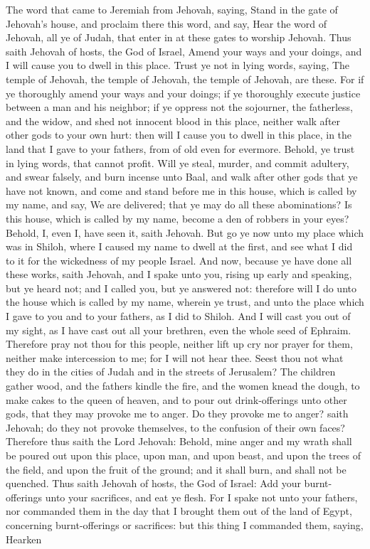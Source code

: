 The word that came to Jeremiah from Jehovah, saying, Stand in the gate of Jehovah’s house, and proclaim there this word, and say, Hear the word of Jehovah, all ye of Judah, that enter in at these gates to worship Jehovah. Thus saith Jehovah of hosts, the God of Israel, Amend your ways and your doings, and I will cause you to dwell in this place. Trust ye not in lying words, saying, The temple of Jehovah, the temple of Jehovah, the temple of Jehovah, are these. For if ye thoroughly amend your ways and your doings; if ye thoroughly execute justice between a man and his neighbor; if ye oppress not the sojourner, the fatherless, and the widow, and shed not innocent blood in this place, neither walk after other gods to your own hurt: then will I cause you to dwell in this place, in the land that I gave to your fathers, from of old even for evermore.  Behold, ye trust in lying words, that cannot profit. Will ye steal, murder, and commit adultery, and swear falsely, and burn incense unto Baal, and walk after other gods that ye have not known, and come and stand before me in this house, which is called by my name, and say, We are delivered; that ye may do all these abominations? Is this house, which is called by my name, become a den of robbers in your eyes? Behold, I, even I, have seen it, saith Jehovah.  But go ye now unto my place which was in Shiloh, where I caused my name to dwell at the first, and see what I did to it for the wickedness of my people Israel. And now, because ye have done all these works, saith Jehovah, and I spake unto you, rising up early and speaking, but ye heard not; and I called you, but ye answered not: therefore will I do unto the house which is called by my name, wherein ye trust, and unto the place which I gave to you and to your fathers, as I did to Shiloh. And I will cast you out of my sight, as I have cast out all your brethren, even the whole seed of Ephraim.  Therefore pray not thou for this people, neither lift up cry nor prayer for them, neither make intercession to me; for I will not hear thee. Seest thou not what they do in the cities of Judah and in the streets of Jerusalem? The children gather wood, and the fathers kindle the fire, and the women knead the dough, to make cakes to the queen of heaven, and to pour out drink-offerings unto other gods, that they may provoke me to anger. Do they provoke me to anger? saith Jehovah; do they not provoke themselves, to the confusion of their own faces? Therefore thus saith the Lord Jehovah: Behold, mine anger and my wrath shall be poured out upon this place, upon man, and upon beast, and upon the trees of the field, and upon the fruit of the ground; and it shall burn, and shall not be quenched.  Thus saith Jehovah of hosts, the God of Israel: Add your burnt-offerings unto your sacrifices, and eat ye flesh. For I spake not unto your fathers, nor commanded them in the day that I brought them out of the land of Egypt, concerning burnt-offerings or sacrifices: but this thing I commanded them, saying, Hearken 